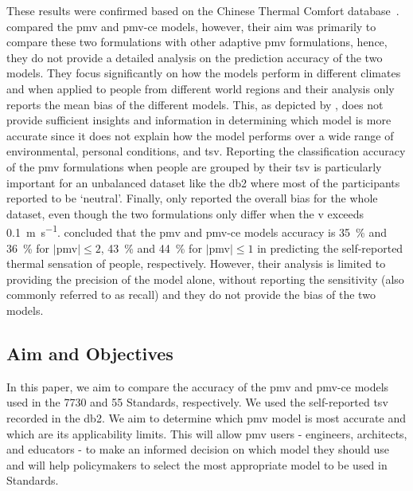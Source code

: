 These results were confirmed based on the Chinese Thermal Comfort database~\cite{du_evaluation_2022}.
 compared the \ac{pmv} and \ac{pmv-ce} models, however, their aim was primarily to compare these two formulations with other adaptive \ac{pmv} formulations, hence, they do not provide a detailed analysis on the prediction accuracy of the two models.
They focus significantly on how the models perform in different climates and when applied to people from different world regions and their analysis only reports the mean bias of the different models.
This, as depicted by , does not provide sufficient insights and information in determining which model is more accurate since it does not explain how the model performs over a wide range of environmental, personal conditions, and \ac{tsv}.
Reporting the classification accuracy of the \ac{pmv} formulations when people are grouped by their \ac{tsv} is particularly important for an unbalanced dataset like the \ac{db2} where most of the participants reported to be `neutral'.
Finally,  only reported the overall bias for the whole dataset, even though the two formulations only differ when the \ac{v} exceeds \qty{0.1}{\m\per\s}.
 concluded that the \ac{pmv} and \ac{pmv-ce} models accuracy is \qty{35}{\percent} and \qty{36}{\percent} for $\mid$\ac{pmv}$\mid \leq 2$, \qty{43}{\percent} and \qty{44}{\percent} for $\mid$\ac{pmv}$\mid \leq 1$ in predicting the self-reported thermal sensation of people, respectively.
However, their analysis is limited to providing the precision of the model alone, without reporting the sensitivity (also commonly referred to as recall) and they do not provide the bias of the two models.

\subsection{Aim and Objectives}\label{subsec:aim-and-objectives}
In this paper, we aim to compare the accuracy of the \ac{pmv} and \ac{pmv-ce} models used in the \gls{7730} and \gls{55} Standards, respectively.
We used the self-reported \ac{tsv} recorded in the \acf{db2}.
We aim to determine which \ac{pmv} model is most accurate and which are its applicability limits.
This will allow \ac{pmv} users - engineers, architects, and educators - to make an informed decision on which model they should use and will help policymakers to select the most appropriate model to be used in Standards.